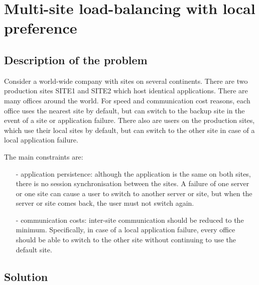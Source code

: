 \section{Multi-site load-balancing with local preference}

\subsection{Description of the problem}

Consider a world-wide company with sites on several continents. There are two
production sites SITE1 and SITE2 which host identical applications. There are
many offices around the world. For speed and communication cost reasons, each
office uses the nearest site by default, but can switch to the backup site in
the event of a site or application failure. There also are users on the
production sites, which use their local sites by default, but can switch to the
other site in case of a local application failure.

The main constraints are:

\begin{itemize}
\item[-] application persistence: although the application is the same on both
    sites, there is no session synchronisation between the sites. A failure
    of one server or one site can cause a user to switch to another server
    or site, but when the server or site comes back, the user must not switch
    again.

\item[-] communication costs: inter-site communication should be reduced to the
    minimum. Specifically, in case of a local application failure, every
    office should be able to switch to the other site without continuing to
    use the default site.
\end{itemize}

\subsection{Solution}

